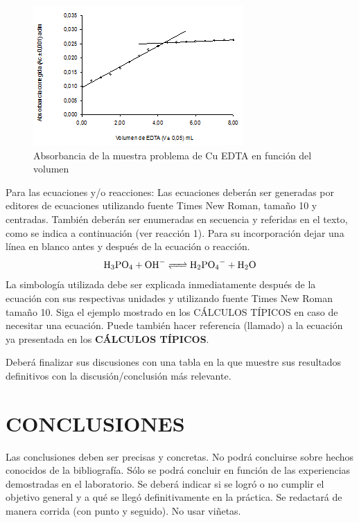 \documentclass[12pt,letterpaper,twocolumn,twoside]{article}
\begin{document}
\begin{figure}[hbt]
\includegraphics[width=\columnwidth]{figura.png}
\caption{Absorbancia de la muestra problema de Cu EDTA en función del volumen}
\label{grafica}
\end{figure}

Para las ecuaciones y/o reacciones: Las ecuaciones deberán ser generadas por editores de ecuaciones utilizando fuente Times New Roman, tamaño 10 y centradas. También deberán ser enumeradas en secuencia y referidas en el texto, como se indica a continuación (ver reacción 1). Para su incorporación dejar una línea en blanco antes y después de la ecuación o reacción. 
\begin{equation}
\ce{H3PO_4 + OH- <=> H_2PO_4^- + H_2O}
\end{equation}
La simbología utilizada debe ser explicada inmediatamente después de la ecuación con sus respectivas unidades y utilizando fuente Times New Roman tamaño 10. Siga el ejemplo mostrado en los CÁLCULOS TÍPICOS en caso de necesitar una ecuación. Puede también hacer referencia (llamado) a la ecuación ya presentada en los \textbf{CÁLCULOS TÍPICOS}.

Deberá finalizar sus discusiones con una tabla en la que muestre sus resultados definitivos con la discusión/conclusión más relevante.



\section*{CONCLUSIONES}
Las conclusiones deben ser precisas y concretas. No podrá concluirse sobre hechos conocidos de la bibliografía. Sólo se podrá concluir en función de las experiencias demostradas en el laboratorio. Se deberá indicar si se logró o no cumplir el objetivo general y a qué se llegó definitivamente en la práctica. Se redactará de manera corrida (con punto y seguido). No usar viñetas.
\end{document}
